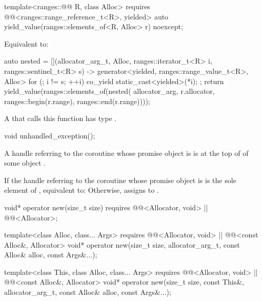 %
\begin{itemdecl}
template<ranges::@@ R, class Alloc>
  requires @@<ranges::range_reference_t<R>, yielded>
  auto yield_value(ranges::elements_of<R, Alloc> r) noexcept;
\end{itemdecl}

\begin{itemdescr}
\pnum
\effects
Equivalent to:
\begin{codeblock}
auto nested = [](allocator_arg_t, Alloc, ranges::iterator_t<R> i, ranges::sentinel_t<R> s)
  -> generator<yielded, ranges::range_value_t<R>, Alloc> {
    for (; i != s; ++i) {
      co_yield static_cast<yielded>(*i);
    }
  };
return yield_value(ranges::elements_of(nested(
  allocator_arg, r.allocator, ranges::begin(r.range), ranges::end(r.range))));
\end{codeblock}

\pnum
\remarks
A  that calls this function
has type .
\end{itemdescr}

%
\begin{itemdecl}
void unhandled_exception();
\end{itemdecl}

\begin{itemdescr}
\pnum
\expects
A handle referring to the coroutine whose promise object is 
is at the top of 
of some  object .

\pnum
\effects
If the handle referring to the coroutine
whose promise object is 
is the sole element of ,
equivalent to: 
Otherwise, assigns  to .
\end{itemdescr}

%
\begin{itemdecl}
void* operator new(size_t size)
  requires @@<Allocator, void> || @@<Allocator>;

template<class Alloc, class... Args>
  requires @@<Allocator, void> || @@<const Alloc&, Allocator>
  void* operator new(size_t size, allocator_arg_t, const Alloc& alloc, const Args&...);

template<class This, class Alloc, class... Args>
  requires @@<Allocator, void> || @@<const Alloc&, Allocator>
  void* operator new(size_t size, const This&, allocator_arg_t, const Alloc& alloc,
                     const Args&...);
\end{itemdecl}

